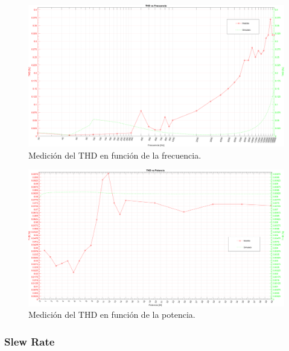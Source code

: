 \begin{figure}[H]
    \centering
    \includegraphics[height=0.65 \textwidth, angle=90]{img/mediciones/THD/THD_vs_frequency.png}
    \caption{Medición del THD en función de la frecuencia.}
    \label{fig:THD_vs_freq}
\end{figure}

\clearpage

\begin{figure}[H]
    \centering
    \includegraphics[height=0.65 \textwidth, angle=90]{img/mediciones/THD/THD_vs_power.png}
    \caption{Medición del THD en función de la potencia.}
    \label{fig:THD_vs_power}
\end{figure}

\clearpage


\subsubsection{Slew Rate}

